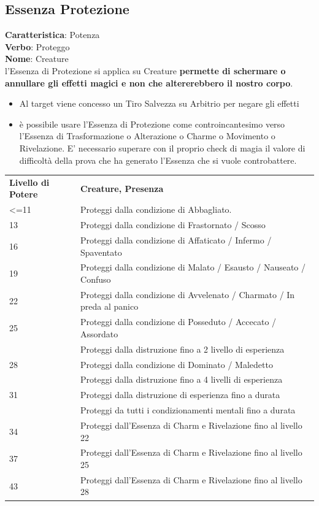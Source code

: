\documentclass[a4paper,11pt,twoside,openany]{book}
\begin{document}
\pagebreak

\subsection{Essenza Protezione}

\label{essenza-protezione---potenza}

\textbf{Caratteristica}: Potenza\\
\textbf{Verbo}: Proteggo\\
\textbf{Nome}: Creature\\

l'Essenza di Protezione si applica su Creature \textbf{permette di schermare o annullare gli effetti magici e non che altererebbero il nostro corpo}.

\begin{itemize}
	\item
	      Al target viene concesso un Tiro Salvezza su Arbitrio per negare gli effetti
	\item
	      è possibile usare l'Essenza di Protezione come controincantesimo verso l'Essenza di Trasformazione o Alterazione o Charme o Movimento o Rivelazione. E' necessario superare con il proprio check di magia il valore di difficoltà della prova che ha generato l'Essenza che si vuole controbattere.
\end{itemize}

\bigskip

\begin{tabularx}{\textwidth}{lX}
	\toprule
	\textbf{Livello di Potere} & \textbf{Creature, Presenza}\tabularnewline
	\textless=11& Proteggi dalla condizione di Abbagliato.\tabularnewline
	13& Proteggi dalla condizione di Frastornato / Scosso\tabularnewline
	16& Proteggi dalla condizione di Affaticato / Infermo / Spaventato\tabularnewline
	19& Proteggi dalla condizione di Malato / Esausto / Nauseato / Confuso\tabularnewline
	22& Proteggi dalla condizione di Avvelenato / Charmato / In preda al panico\tabularnewline
	25& Proteggi dalla condizione di Posseduto / Accecato / Assordato \\
	  & Proteggi dalla distruzione fino a 2 livello di esperienza   \\
	28& Proteggi dalla condizione di Dominato / Maledetto   \\
	  & Proteggi dalla distruzione fino a 4 livelli di esperienza   \\
	31& Proteggi dalla distruzione di esperienza fino a durata   \\
	  & Proteggi da tutti i condizionamenti mentali fino a durata\\
	34& Proteggi dall'Essenza di Charm e Rivelazione fino al livello 22\tabularnewline
	37& Proteggi dall'Essenza di Charm e Rivelazione fino al livello 25\tabularnewline
	43& Proteggi dall'Essenza di Charm e Rivelazione fino al livello 28\tabularnewline
\end{tabularx}
\end{document}
